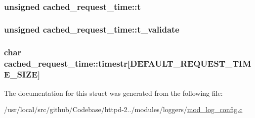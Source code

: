 \subsubsection[{\texorpdfstring{t}{t}}]{\setlength{\rightskip}{0pt plus 5cm}unsigned cached\+\_\+request\+\_\+time\+::t}\hypertarget{structcached__request__time_a6ffb326f81d0128ff3cb9904636d185c}{}\label{structcached__request__time_a6ffb326f81d0128ff3cb9904636d185c}
\subsubsection[{\texorpdfstring{t\+\_\+validate}{t_validate}}]{\setlength{\rightskip}{0pt plus 5cm}unsigned cached\+\_\+request\+\_\+time\+::t\+\_\+validate}\hypertarget{structcached__request__time_ace37638601f7033c4f1e3833553dd443}{}\label{structcached__request__time_ace37638601f7033c4f1e3833553dd443}
\subsubsection[{\texorpdfstring{timestr}{timestr}}]{\setlength{\rightskip}{0pt plus 5cm}char cached\+\_\+request\+\_\+time\+::timestr\mbox{[}{\bf D\+E\+F\+A\+U\+L\+T\+\_\+\+R\+E\+Q\+U\+E\+S\+T\+\_\+\+T\+I\+M\+E\+\_\+\+S\+I\+ZE}\mbox{]}}\hypertarget{structcached__request__time_a6a2659c8059f54f7dfc33cbf41a31e8f}{}\label{structcached__request__time_a6a2659c8059f54f7dfc33cbf41a31e8f}


The documentation for this struct was generated from the following file\+:\begin{DoxyCompactItemize}
\item 
/usr/local/src/github/\+Codebase/httpd-\/2../modules/loggers/\hyperlink{mod__log__config_8c}{mod\+\_\+log\+\_\+config.\+c}\end{DoxyCompactItemize}

